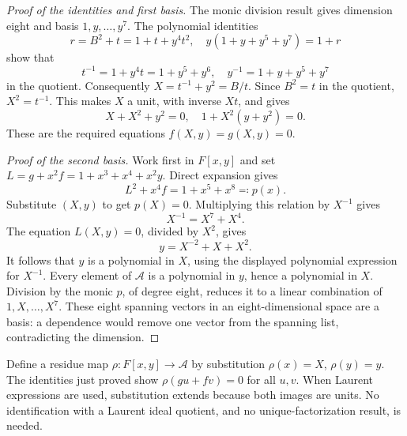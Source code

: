 \documentclass{article}
\begin{document}
\begin{proof}[Proof of the identities and first basis]
  The monic division result gives dimension eight and basis \(1, y, \dots, y^7\). The
  polynomial identities
  \begin{equation}
    r = B^2 + t = 1 + t + y^4 t^2, \quad y(1 + y + y^5 + y^7) = 1 + r
  \end{equation}
  show that
  \begin{equation}
    t^{-1} = 1 + y^4 t = 1 + y^5 + y^6, \quad y^{-1} = 1 + y + y^5 + y^7
  \end{equation}
  in the quotient. Consequently \(X = t^{-1} + y^2 = B/t\). Since \(B^2 = t\) in the quotient,
  \(X^2 = t^{-1}\). This makes \(X\) a unit, with inverse \(Xt\), and gives
  \begin{equation}
    X + X^2 + y^2 = 0, \quad 1 + X^2(y + y^2) = 0.
  \end{equation}
  These are the required equations \(f(X,y) = g(X,y) = 0\).

  \emph{Proof of the second basis.} Work first in \(F[x,y]\) and set
  \(L = g + x^2 f = 1 + x^3 + x^4 + x^2 y\). Direct expansion gives
  \begin{equation}
    L^2 + x^4 f = 1 + x^5 + x^8 \eqqcolon p(x).
  \end{equation}
  Substitute \((X,y)\) to get \(p(X) = 0\). Multiplying this relation by \(X^{-1}\) gives
  \begin{equation}
    X^{-1} = X^7 + X^4.
  \end{equation}
  The equation \(L(X,y) = 0\), divided by \(X^2\), gives
  \begin{equation}
    y = X^{-2} + X + X^2.
  \end{equation}
  It follows that \(y\) is a polynomial in \(X\), using the displayed polynomial expression for
  \(X^{-1}\). Every element of \(\mathcal{A}\) is a polynomial in \(y\), hence a polynomial in
  \(X\). Division by the monic \(p\), of degree eight, reduces it to a linear combination of
  \(1, X, \dots, X^7\). These eight spanning vectors in an eight-dimensional space are a basis: a
  dependence would remove one vector from the spanning list, contradicting the dimension.
\end{proof}

Define a residue map \(\rho \colon F[x,y] \to \mathcal{A}\) by substitution \(\rho(x) = X\),
\(\rho(y) = y\). The identities just proved show \(\rho(gu + fv) = 0\) for all \(u, v\). When
Laurent expressions are used, substitution extends because both images are units. No
identification with a Laurent ideal quotient, and no unique-factorization result, is needed.
\end{document}
